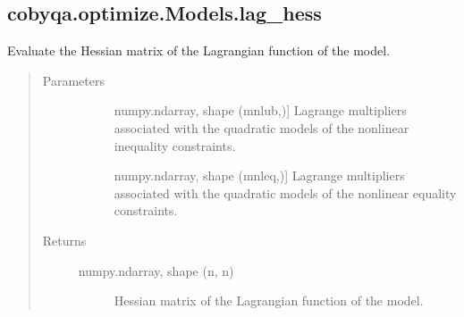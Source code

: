 \documentclass[letterpaper,10pt,english]{sphinxmanual}
\begin{document}
\begin{fulllineitems}
\begin{fulllineitems}
\end{fulllineitems}



\subsection{cobyqa.optimize.Models.lag\_hess}
\label{\detokenize{refs/generated/cobyqa.optimize.Models.lag_hess:cobyqa-optimize-models-lag-hess}}\label{\detokenize{refs/generated/cobyqa.optimize.Models.lag_hess::doc}}

\begin{fulllineitems}
\label{\detokenize{refs/generated/cobyqa.optimize.Models.lag_hess:cobyqa.optimize.Models.lag_hess}}
\sphinxAtStartPar
Evaluate the Hessian matrix of the Lagrangian function of the model.
\begin{quote}\begin{description}
\item[{Parameters}] \leavevmode\begin{description}
\item[{}] \leavevmode{[}numpy.ndarray, shape (mnlub,){]}
\sphinxAtStartPar
Lagrange multipliers associated with the quadratic models of the
nonlinear inequality constraints.

\item[{}] \leavevmode{[}numpy.ndarray, shape (mnleq,){]}
\sphinxAtStartPar
Lagrange multipliers associated with the quadratic models of the
nonlinear equality constraints.

\end{description}

\item[{Returns}] \leavevmode\begin{description}
\item[{numpy.ndarray, shape (n, n)}] \leavevmode
\sphinxAtStartPar
Hessian matrix of the Lagrangian function of the model.

\end{description}

\end{description}\end{quote}

\end{fulllineitems}




\end{fulllineitems}
\end{document}
